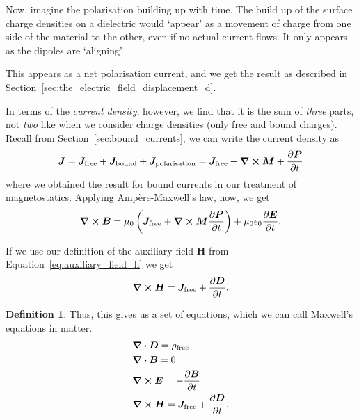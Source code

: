 \documentclass[12pt,chapterprefix=false,dvipsnames]{scrbook}
\theoremstyle{dotless}
\theoremstyle{definition}
\newtheorem{protodefinition}{Definition}[section]
\newenvironment{definition}
{\colorlet{shadecolor}{black!15}\begin{shaded}\begin{protodefinition}}
			{\end{protodefinition}\end{shaded}}
\begin{document}
Now, imagine the polarisation building up with time. The build
up of the surface charge densities on a dielectric would
`appear' as a movement of charge from one side of the material
to the other, even if no actual current flows. It only appears
as the dipoles are `aligning'.

This appears as a net polarisation current, and we get the
result as described in Section~\ref{sec:the_electric_field_displacement_d}.

In terms of the \textit{current density}, however, we find that
it is the sum of \textit{three} parts, not
\textit{two} like when we consider charge densities
(only free and bound charges). Recall from
Section~\ref{sec:bound_currents}, we can write the current
density as
\begin{equation}
	\label{eq:current_density_polarisation}%
	\bm{J} =
	\bm{J}_\textrm{free} +
	\bm{J}_\textrm{bound} +
	\bm{J}_\textrm{polarisation} =
	\bm{J}_\textrm{free} +
	\curl{\bm{M}} + \pdv{\bm{P}}{t}
\end{equation}
where we obtained the result for bound currents in our treatment
of magnetostatics. Applying Ampère-Maxwell's law, now, we get
\begin{equation}
	\label{eq:ampere_maxwell_polarisation}%
	\curl{\bm{B}} =
	\mu_{0}\left(\bm{J}_\textrm{free} + \curl{\bm{M}} \pdv{\bm{P}}{t}\right) +
	\mu_{0}\epsilon_{0}\pdv{\bm{E}}{t}.
\end{equation}

If we use our definition of the auxiliary field
$\bm{H}$ from Equation~\ref{eq:auxiliary_field_h}
we get
\begin{equation}
	\label{eq:auxiliary_field_polarisation_maxwell}%
	\curl{\bm{H}} =
	\bm{J}_\textrm{free} +
	\pdv{\bm{D}}{t}.
\end{equation}

\begin{definition}
	Thus, this gives us a set of equations, which we can call
	Maxwell's equations in matter.
	\begin{equation}
		\label{eq:maxwells_equation_in_matter}%
		\begin{aligned}
			 & \divergence{\bm{D}} = \rho_\textrm{free}                \\
			 & \divergence{\bm{B}} = 0                                 \\
			 & \curl{\bm{E}} = -\pdv{\bm{B}}{t}                        \\
			 & \curl{\bm{H}} = \bm{J}_\textrm{free} + \pdv{\bm{D}}{t}.
		\end{aligned}
	\end{equation}
\end{definition}
\end{document}
